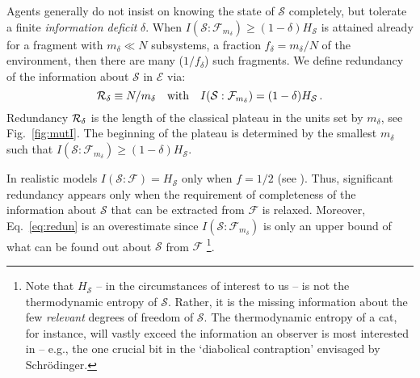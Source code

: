 \documentclass[aps,prl,showpacs,amsmath,amssymb,amsfonts,lengthcheck,twocolumn,longbibliography,superscriptaddress]{revtex4-2}
\newcommand{\cS}        {{\mathcal S}}
\newcommand{\cE}        {{\mathcal E}}
\newcommand{\+}         {\dagger}
\newcommand\cF{{\mathcal F}}
\newcommand{\mc}[1]{\mathcal{#1}}
\begin{document}
Agents generally do not insist on knowing the state of $\cS$ completely, but tolerate a finite {\it information deficit} $\delta$. When $I(\cS : \cF_{m_\delta}) \geq (1-\delta) H_\cS$ is attained already for a fragment with $m_\delta \ll N$ subsystems, a fraction $f_\delta=m_\delta /N$ of the environment, then there are many ($1/f_\delta$) such fragments. We define redundancy of the information about $\cS$ in $\cE$ via:
\begin{equation}
\label{eq:redun}
{\cal R}_{\delta} \equiv N/m_\delta \quad \text{with}\quad I(\cS : \cF_{m_\delta}) = (1-\delta) H_\cS\,.
\end{equation}
Redundancy ${\cal R}_{\delta}$ is the length of the classical plateau in the units set by $m_\delta$, see Fig.~\eqref{fig:mutI}. The beginning of the plateau is determined by the smallest $m_\delta$ such that $I(\cS : \cF_{m_\delta}) \geq (1-\delta) H_\cS$. 

In realistic models $I(\cS : \cF)=H_\cS$ only when $ f = 1/2$ (see \cite{blume2005simple}). Thus, significant redundancy appears only when the requirement of completeness of the information about $\cS$ that can be extracted from $\cF$ is relaxed. Moreover,  Eq.~\eqref{eq:redun} is an overestimate since $I(\cS : \cF_{m_\delta}) $ is only an upper bound of what can be found out about $\cS$ from $\cF$ \footnote{Note that $H_{\cS}$ -- in the circumstances of interest to us -- is not the thermodynamic entropy of $\cS$. Rather, it is the missing information about the few {\it relevant} degrees of freedom of $\cS$. The thermodynamic entropy of a cat, for instance, will vastly exceed the information an observer is most interested in -- e.g., the one crucial bit in the `diabolical contraption' envisaged by Schr{\"o}dinger.}.
\end{document}
